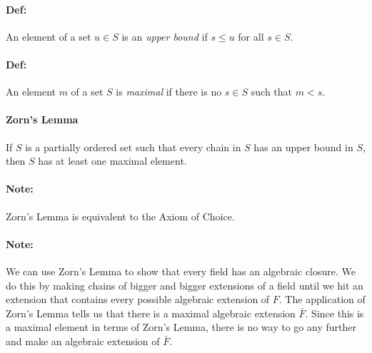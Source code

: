 \documentclass[10pt,a4paper]{article}
\begin{document}
\paragraph{Def:} An element of a set $u \in S$ is an \textit{upper bound} if $ s \leq u$ for all $s \in S$.

\paragraph{Def:} An element $m$ of a set $S$ is \textit{maximal} if there is no $s \in S$ such that $m < s$.

\paragraph{Zorn's Lemma} If $S$ is a partially ordered set such that every chain in $S$ has an upper bound in $S$, then $S$ has at least one maximal element.

\paragraph{Note:} Zorn's Lemma is equivalent to the Axiom of Choice.

\paragraph{Note:} We can use Zorn's Lemma to show that every field has an algebraic closure. We do this by making chains of bigger and bigger extensions of a field until we hit an extension that contains every possible algebraic extension of $F$. The application of Zorn's Lemma tells us that there is a maximal algebraic extension $\bar{F}$. Since this is a maximal element in terms of Zorn's Lemma, there is no way to go any further and make an algebraic extension of $\bar{F}$. 
\end{document}
